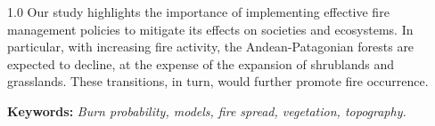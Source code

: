 \begin{spacing}{1.0}
Our study highlights the importance of implementing effective fire management policies to mitigate its effects on societies and ecosystems. In particular, with increasing fire activity, the Andean-Patagonian forests are expected to decline, at the expense of the expansion of shrublands and grasslands. These transitions, in turn, would further promote fire occurrence.

\noindent \textbf{Keywords:}  \textit{Burn probability, models, fire spread, vegetation, topography.}

\end{spacing}
